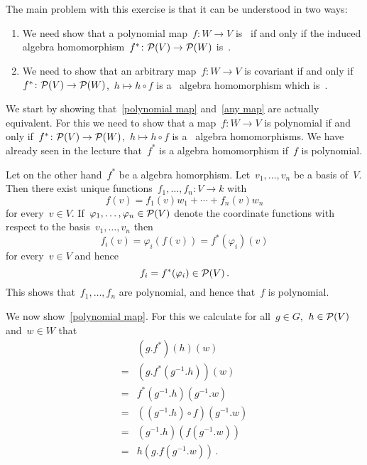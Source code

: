 \section{}





\subsection{}

The main problem with this exercise is that it can be understood in two ways:
\begin{enumerate}
  \item
    \label{polynomial map}
    We need show that a polynomial map~$f \colon W \to V$ is~ if and only if the induced algebra homomorphism~$f^* \colon \mathcal{P}(V) \to \mathcal{P}(W)$ is~.
  \item
    \label{any map}
    We need to show that an arbitrary map~$f \colon W \to V$ is covariant if and only if~$f^* \colon \mathcal{P}(V) \to \mathcal{P}(W)$,~$h \mapsto h \circ f$ is a~{\welldef} algebra homomorphism which is~.
\end{enumerate}


We start by showing that~\ref*{polynomial map} and~\ref*{any map} are actually equivalent.
For this we need to show that a map~$f \colon W \to V$ is polynomial if and only if~$f^* \colon \mathcal{P}(V) \to \mathcal{P}(W)$,~$h \mapsto h \circ f$ is a~{\welldef} algebra homomorphisms.
We have already seen in the lecture that~$f^*$ is a {\welldef} algebra homomorphism if~$f$ is polynomial.

Let on the other hand~$f^*$ be a {\welldef} algebra homorphism.
Let~$v_1, \dotsc, v_n$ be a basis of~$V$.
Then there exist unique functions~$f_1, \dotsc, f_n \colon V \to k$ with
\[
    f(v)
  = f_1(v) w_1 + \dotsb + f_n(v) w_n
\]
for every~$v \in V$.
If~$\varphi_1, \dotsc, \varphi_n \in \mathcal{P}(V)$ denote the coordinate functions with respect to the basis~$v_1, \dotsc, v_n$ then
\[
    f_i(v)
  = \varphi_i( f(v) )
  = f^*(\varphi_i)(v)
\]
for every~$v \in V$ and hence
\[
      f_i
  =   f^*(\varphi_i)
  \in \mathcal{P}(V) \,.
\]
This shows that~$f_1, \dotsc, f_n$ are polynomial, and hence that~$f$ is polynomial.

We now show~\ref*{polynomial map}.
For this we calculate for all~$g \in G$,~$h \in \mathcal{P}(V)$ and~$w \in W$ that
\begin{align*}
   {}&  (g.f^*)(h)(w) \\
  ={}&  (g.f^*(g^{-1}.h))(w)  \\
  ={}&  f^*(g^{-1}.h)(g^{-1}.w) \\
  ={}&  ((g^{-1}.h) \circ f)(g^{-1}.w)  \\
  ={}&  (g^{-1}.h)( f( g^{-1}.w ) ) \\
  ={}&  h( g.f( g^{-1}.w ) ) \,.
\end{align*}

